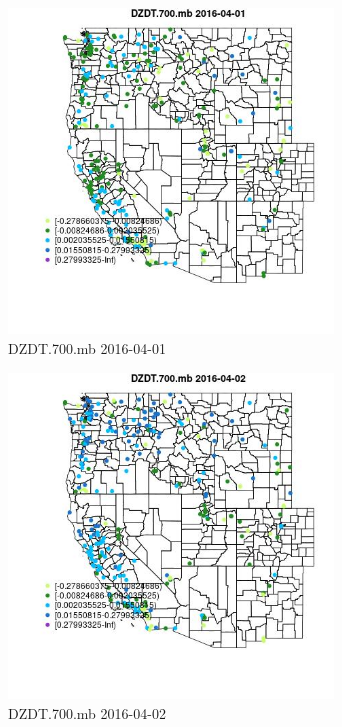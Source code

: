 \begin{figure} 
\centering  
\includegraphics[width=0.77\textwidth]{Code_Outputs/Report_ML_input_PM25_Step4_part_e_de_duplicated_aveswNAs_MapObsDZDT700mb2016-04-01.jpg} 
\caption{\label{fig:Report_ML_input_PM25_Step4_part_e_de_duplicated_aveswNAsMapObsDZDT700mb2016-04-01}DZDT.700.mb 2016-04-01} 
\end{figure} 
 

\begin{figure} 
\centering  
\includegraphics[width=0.77\textwidth]{Code_Outputs/Report_ML_input_PM25_Step4_part_e_de_duplicated_aveswNAs_MapObsDZDT700mb2016-04-02.jpg} 
\caption{\label{fig:Report_ML_input_PM25_Step4_part_e_de_duplicated_aveswNAsMapObsDZDT700mb2016-04-02}DZDT.700.mb 2016-04-02} 
\end{figure} 
 
